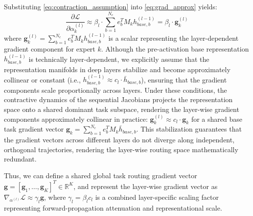Substituting \cref{eq:contraction_assumption} into \cref{eq:grad_approx} yields:
\begin{equation}
\frac{\partial \mathcal{L}}{\partial \alpha_k^{(l)}} \approx \beta_l \cdot \sum_{b=1}^{N_c} e_b^T M_k h_{base, b}^{(l-1)} = \beta_l \cdot \mathbf{g}_k^{(l)}
\label{eq:collinear_gradient}
\end{equation}
where $\mathbf{g}_k^{(l)} = \sum_{b=1}^{N_c} e_b^T M_k h_{base, b}^{(l-1)}$ is a scalar representing the layer-dependent gradient component for expert $k$. Although the pre-activation base representation $h_{base, b}^{(l-1)}$ is technically layer-dependent, we explicitly assume that the representation manifolds in deep layers stabilize and become approximately collinear or constant (i.e., $h_{base, b}^{(l-1)} \approx c_l \cdot \bar{h}_{base, b}$), ensuring that the gradient components scale proportionally across layers. Under these conditions, the contractive dynamics of the sequential Jacobians projects the representation space onto a shared dominant task subspace, rendering the layer-wise gradient components approximately collinear in practice: $\mathbf{g}_k^{(l)} \approx c_l \cdot \mathbf{g}_k$ for a shared base task gradient vector $\mathbf{g}_k = \sum_{b=1}^{N_c} e_b^T M_k \bar{h}_{base, b}$. This stabilization guarantees that the gradient vectors across different layers do not diverge along independent, orthogonal trajectories, rendering the layer-wise routing space mathematically redundant. 

Thus, we can define a shared global task routing gradient vector $\mathbf{g} = [\mathbf{g}_1, \dots, \mathbf{g}_K]^T \in \mathbb{R}^K$, and represent the layer-wise gradient vector as $\nabla_{\alpha^{(l)}} \mathcal{L} \approx \gamma_l \mathbf{g}$, where $\gamma_l = \beta_l c_l$ is a combined layer-specific scaling factor representing forward-propagation attenuation and representational scale.


